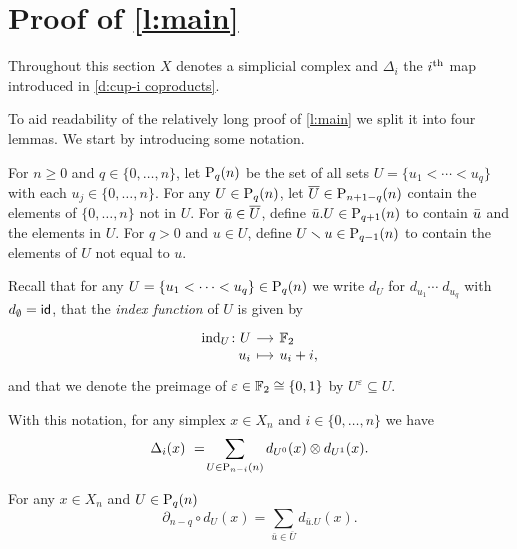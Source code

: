 
\section{Proof of \texorpdfstring{\cref{l:main}}{main lemma}} \label{s:proof}

Throughout this section $X$ denotes a simplicial complex and $\Delta_i$ the $i^\th$ map introduced in \cref{d:cup-i coproducts}.

To aid readability of the relatively long proof of \cref{l:main} we split it into four lemmas.
We start by introducing some notation.

\begin{definition}
	For $n \geq0$ and $q \in \{0, \dots, n\}$, let $\P_q(n)$ be the set of all sets $U = \{u_1 < \cdots < u_q\}$ with each $u_j \in \{0, \dots, n\}$.
	For any $U \in \P_q(n)$, let $\overline{U} \in \P_{n+1-q}(n)$ contain the elements of $\{0, \dots, n\}$ not in $U$. For $\bu \in \overline{U}$, define $\bu.U \in \P_{q+1}(n)$ to contain $\bu$ and the elements in $U$.
	For $q > 0$ and $u \in U$, define $U \sm u \in \P_{q-1}(n)$ to contain the elements of $U$ not equal to $u$.
\end{definition}

Recall that for any $U = \{u_1 < \cdots < u_q\} \in \P_q(n)$ we write $d_U$ for $d_{u_1} \cdots \; d_{u_q}$ with $d_{\emptyset} = \id$, that
the \textit{index function} of $U$ is given by
\begin{equation*}
\begin{tikzcd}[row sep=-3pt, column sep=small,
/tikz/column 1/.append style={anchor=base east},
/tikz/column 2/.append style={anchor=base west}]
\ind_U \colon U \arrow[r] & \Ftwo \\
u_i \arrow[r, mapsto] & u_i + i,
\end{tikzcd}
\end{equation*}
and that we denote the preimage of $\varepsilon \in \Ftwo \cong \{0, 1\}$ by $U^\varepsilon \subseteq U$.

With this notation, for any simplex $x \in X_n$ and $i \in \{0, \dots, n\}$ we have
\begin{equation*}
\Delta_{i}(x)\ =\! \sum_{U \in \P_{n-i}(n)} d_{U^0}(x) \ot d_{U^1}(x).
\end{equation*}

\begin{lemma} \label{l:partial dU = dxU}
	For any $x \in X_n$ and $U \in \P_{q}(n)$
	\begin{equation} \label{lemma1: existence:eq1}
	\partial_{n-q} \circ d_U(x) = \sum_{\bar{u} \in \overline{U}} d_{\bar{u}.U}(x).
	\end{equation}
\end{lemma}

